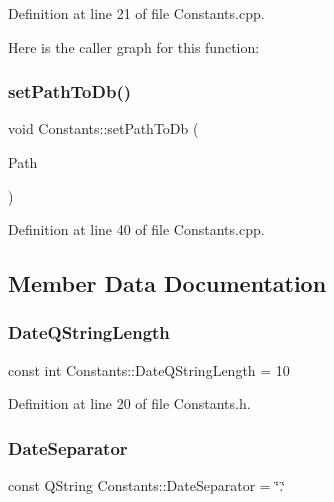 Definition at line 21 of file Constants.\+cpp.

Here is the caller graph for this function\+:
\hypertarget{classConstants_ab9a63f6d49de9a335b18e5ac543ec0fc}{}\label{classConstants_ab9a63f6d49de9a335b18e5ac543ec0fc} 
\subsubsection{\texorpdfstring{set\+Path\+To\+Db()}{setPathToDb()}\hspace{0.1cm}{\footnotesize\ttfamily [2/2]}}
{\footnotesize\ttfamily void Constants\+::set\+Path\+To\+Db (\begin{DoxyParamCaption}\item[{Q\+String \&}]{Path }\end{DoxyParamCaption})\hspace{0.3cm}{\ttfamily [static]}}



Definition at line 40 of file Constants.\+cpp.



\subsection{Member Data Documentation}
\hypertarget{classConstants_ae5b9b8df2388680fdacc61f9c247307d}{}\label{classConstants_ae5b9b8df2388680fdacc61f9c247307d} 
\subsubsection{\texorpdfstring{Date\+Q\+String\+Length}{DateQStringLength}}
{\footnotesize\ttfamily const int Constants\+::\+Date\+Q\+String\+Length = 10\hspace{0.3cm}{\ttfamily [static]}}



Definition at line 20 of file Constants.\+h.

\hypertarget{classConstants_a1b884c97c8f0c86fa5f8e050e38deca4}{}\label{classConstants_a1b884c97c8f0c86fa5f8e050e38deca4} 
\subsubsection{\texorpdfstring{Date\+Separator}{DateSeparator}}
{\footnotesize\ttfamily const Q\+String Constants\+::\+Date\+Separator = \char`\"{}.\char`\"{}\hspace{0.3cm}{\ttfamily [static]}}



